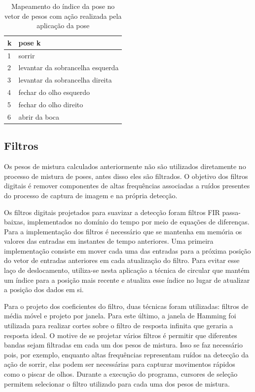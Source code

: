 \begin{table}[!htb]
\centering
\begin{tabular}{|l|l|}
\hline
k & pose k  \\ \hline
1 & sorrir  \\ \hline
2 & levantar da sobrancelha esquerda\\ \hline
3 & levantar da sobrancelha direita \\ 	\hline
4 & fechar do olho esquerdo  \\ \hline
5 & fechar do olho direito \\ \hline
6 & abrir da boca  \\ \hline
\end{tabular}
\caption{Mapeamento do índice da pose no vetor de pesos com ação realizada pela aplicação da pose}
\label{tab:poses-descr}
\end{table}



\subsection{Filtros}

Os pesos de mistura calculados anteriormente não são utilizados diretamente no processo de mistura de poses, antes disso eles são filtrados. O objetivo dos filtros digitais é remover componentes de altas frequências associadas a ruídos presentes do processo de captura de imagem e na própria detecção. 

Os filtros digitais projetados para suavizar a detecção foram filtros FIR passa-baixas, implementados no domínio do tempo por meio de equações de diferenças. Para a implementação dos filtros é necessário que se mantenha em memória os valores das entradas em instantes de tempo anteriores. Uma primeira implementação consiste em mover cada uma das entradas para a próxima posição do vetor de entradas anteriores em cada atualização do filtro. Para evitar esse laço de deslocamento, utiliza-se nesta aplicação a técnica de  circular que mantém um índice para a posição mais recente e atualiza esse índice no lugar de atualizar a posição dos dados em si.


Para o projeto dos coeficientes do filtro, duas técnicas foram utilizadas: filtros de média móvel e projeto por janela. Para este último, a janela de Hamming foi utilizada para realizar cortes sobre o filtro de resposta infinita que geraria a resposta ideal. O motive de se projetar vários filtros é permitir que diferentes bandas sejam filtradas em cada um dos pesos de mistura. Isso se faz necessário pois, por exemplo, enquanto altas frequências representam ruídos na detecção da ação de sorrir, elas podem ser necessárias para capturar movimentos rápidos como o piscar de olhos. Durante a execução do programa, cursores de seleção permitem selecionar o filtro utilizado para cada uma dos pesos de mistura.


